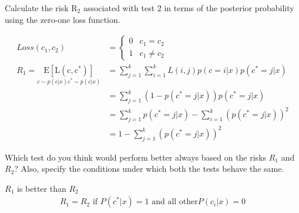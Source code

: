 \documentclass[solution,addpoints,12pt]{exam}
\begin{document}
\begin{questions}
\begin{parts}
\begin{subparts}
\subpart[2] Calculate the risk $\mathrm{R_2}$ associated with test 2 in terms of the posterior probability using the zero-one loss function.
\begin{solution}
  \begin{align*}
    Loss(c_1 , c_2) &=\begin{cases}
        0 & c_1 = c_2 \\ 
        1 & c_1 \neq c_2 
    \end{cases} \\ 
    R_1 = \operatorname*{E[L(c,c^{*})]}_{c\sim p(c|x)c^{*} \sim p(c|x)} &= \sum_{j = 1}^{k}\sum_{i=1}^{k}L(i,j)p(c = i|x)p(c^{*} = j|x) \\
    &= \sum_{j=1}^{k}(1 - p(c^{*} = j|x)) p(c^{*} = j|x) \\
    &=  \sum_{j=1}^{k}p(c^{*} = j|x) - \sum_{i=1}^{k}(p(c^{*} = j|x))^{2}  \\
    &= 1 - \sum_{j=1}^{k}(p(c^{*} = j|x))^{2} 
  \end{align*}
\end{solution}

\subpart[2] Which test do you think would perform better always based on the risks $R_1$ and $R_2$? Also, specify the conditions under which both the tests behave the same.
\begin{solution}

  $R_1$ is better than $R_2$   
  \begin{align*}
    R_1 = R_2 \text{ if }  P(c^{*}|x) = 1 \text{ and all other} P (c_i|x) =0
  \end{align*}
  
\end{solution}
\end{subparts}
\end{parts}


\begin{parts}

\end{parts}
\end{questions}
\end{document}

